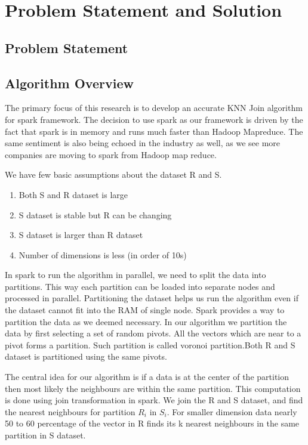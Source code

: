\chapter{Problem Statement and Solution} \label{chap:Problem Statement
  and Solution}
\section{Problem Statement}

\section{Algorithm Overview}
The primary focus of this research is to develop an accurate KNN
Join algorithm for spark framework. The decision to use spark as our
framework is driven by
the fact that spark is in memory and runs much faster than Hadoop
Mapreduce. The same sentiment is also being echoed in the industry as
well, as we see more companies are moving to spark from Hadoop map
reduce.

We have few basic assumptions about the dataset R and S.
\begin{enumerate}
\item Both S and R dataset is large
\item S dataset is stable but R can be changing
\item S dataset is larger than R dataset
\item Number of dimensions is less (in order of 10s)
\end{enumerate}

In spark to run the algorithm in parallel, we need to split the data
into partitions. This way each partition can be loaded into separate
nodes and processed in parallel. Partitioning the dataset helps us run
the algorithm even if the dataset cannot fit into the RAM of single
node. Spark provides a way to partition the data as we deemed necessary.
In our algorithm we partition the data by first selecting a set of
random pivots. All the vectors which are near to a pivot forms a
partition. Such partition is called voronoi partition.Both R and S
dataset is partitioned using the same pivots.

The central
idea for our algorithm is if a data is at the center of the partition
then most likely the neighbours are within the same partition. This
computation is done using join transformation in spark. We join
the R and S dataset, and find the nearest neighbours for partition
$R_i$ in $S_i$. For smaller dimension data nearly 50 to 60 percentage
of the vector in R finds its k nearest neighbours in the same
partition in S dataset.

